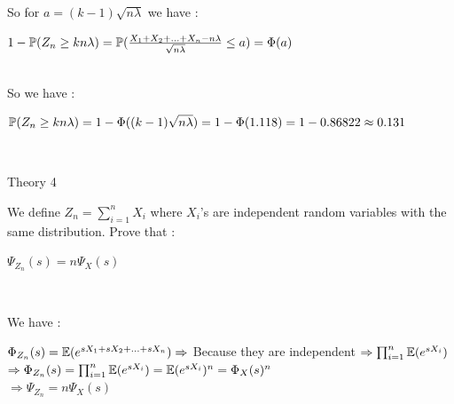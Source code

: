 \documentclass[30pt]{article}
\begin{document}
So for $a = (k-1)\sqrt{n\lambda} $ we have : \\ 
\begin{center}
    $1 - \Bbb{P}(Z_n \ge kn\lambda) = \Bbb{P}(\frac{X_1+X_2+...+X_n - n\lambda}{\sqrt{n\lambda}} \le a ) = \Phi(a)  $ \\
\end{center} \\
So we have : \\ 
\begin{center}
    $\Bbb{P}(Z_n \ge kn\lambda) = 1 - \Phi((k-1)\sqrt{n\lambda}) = 1 - \Phi(1.118) = 1 - 0.86822 \approx 0.131 $
\end{center} \\ \newline 

{\Large \color{blue} Theory 4 } \\
{\color{blue} We define $Z_n = \sum_{i=1}^{n}{X_i}$ where $X_i$'s are independent random variables with the same distribution. Prove that : \\
\begin{center}
    $\Psi_{Z_n}(s) = n \Psi_X(s) $
\end{center}
\\ } \newline
We have : \\
\begin{center}
    $\Phi_{Z_n}(s) = \Bbb{E}(e^{sX_1+sX_2+...+sX_n}) \Rightarrow $ Because they are independent $ \Rightarrow \prod_{i =1}^{n} \Bbb{E}(e^{sX_i}) $ \vspace{0.25cm}\\
    $\Rightarrow \Phi_{Z_n}(s) = \prod_{i =1}^{n} \Bbb{E}(e^{sX_i}) = \mathbb{E}(e^{sX_i})^n = \Phi_X(s)^n $ \vspace{0.25cm} \\
    $\Rightarrow \Psi_{Z_n} = n \Psi_X(s) $
\end{center} \\
\end{document}
